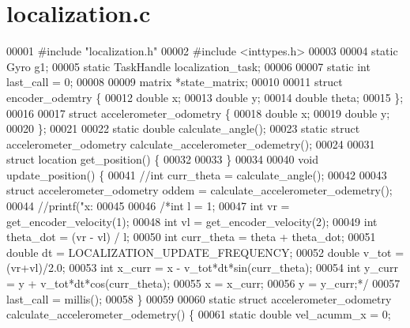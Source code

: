 \section{localization.\+c}
\label{localization_8c_source}

\begin{DoxyCode}
00001 \textcolor{preprocessor}{#include "localization.h"}
00002 \textcolor{preprocessor}{#include <inttypes.h>}
00003 
00004 \textcolor{keyword}{static} Gyro g1;
00005 \textcolor{keyword}{static} TaskHandle localization_task;
00006 
00007 \textcolor{keyword}{static} \textcolor{keywordtype}{int} last_call = 0;
00008 
00009 matrix *state_matrix;
00010 
00011 \textcolor{keyword}{struct }encoder_odemtry \{
00012   \textcolor{keywordtype}{double} x;
00013   \textcolor{keywordtype}{double} y;
00014   \textcolor{keywordtype}{double} theta;
00015 \};
00016 
00017 \textcolor{keyword}{struct }accelerometer_odometry \{
00018   \textcolor{keywordtype}{double} x;
00019   \textcolor{keywordtype}{double} y;
00020 \};
00021 
00022 \textcolor{keyword}{static} \textcolor{keywordtype}{double} calculate_angle();
00023 \textcolor{keyword}{static} \textcolor{keyword}{struct }accelerometer_odometry calculate_accelerometer_odemetry();
00024 
00031 \textcolor{keyword}{struct }location get_position() \{
00032 
00033 \}
00034 
00040 \textcolor{keywordtype}{void} update_position() \{
00041   \textcolor{comment}{//int curr\_theta = calculate\_angle();}
00042 
00043   \textcolor{keyword}{struct }accelerometer_odometry oddem = calculate_accelerometer_odemetry();
00044   \textcolor{comment}{//printf("x: %
00045 
00046   \textcolor{comment}{/*int l = 1;}
00047 \textcolor{comment}{  int vr = get\_encoder\_velocity(1);}
00048 \textcolor{comment}{  int vl = get\_encoder\_velocity(2);}
00049 \textcolor{comment}{  int theta\_dot = (vr - vl) / l;}
00050 \textcolor{comment}{  int curr\_theta = theta + theta\_dot;}
00051 \textcolor{comment}{  double dt = LOCALIZATION\_UPDATE\_FREQUENCY;}
00052 \textcolor{comment}{  double v\_tot = (vr+vl)/2.0;}
00053 \textcolor{comment}{  int x\_curr = x - v\_tot*dt*sin(curr\_theta);}
00054 \textcolor{comment}{  int y\_curr = y + v\_tot*dt*cos(curr\_theta);}
00055 \textcolor{comment}{  x = x\_curr;}
00056 \textcolor{comment}{  y = y\_curr;*/}
00057   last_call = millis();
00058 \}
00059 
00060 \textcolor{keyword}{static} \textcolor{keyword}{struct }accelerometer_odometry calculate_accelerometer_odemetry() \{
00061   \textcolor{keyword}{static} \textcolor{keywordtype}{double} vel\_acumm\_x = 0;
}
\end{DoxyCode}
